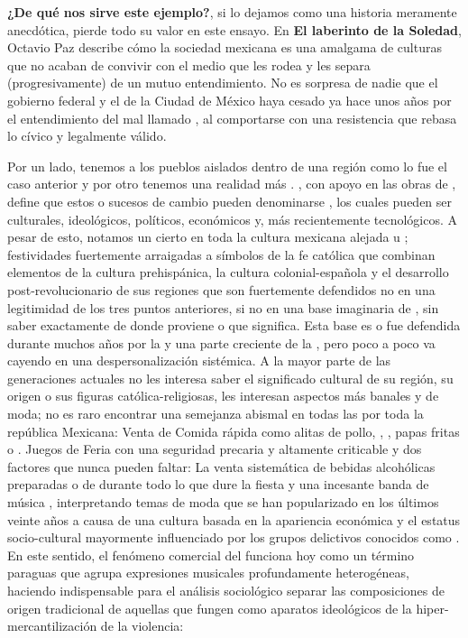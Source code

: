 \textbf{¿De qué nos sirve este ejemplo?}, si lo dejamos como una historia meramente anecdótica, pierde todo su valor en este ensayo.
En \textbf{El laberinto de la Soledad}, Octavio Paz describe cómo la sociedad mexicana es una amalgama de culturas que no acaban de
convivir con el medio que les rodea y les separa (progresivamente) de un mutuo entendimiento. No es sorpresa de nadie que el gobierno
federal y el de la Ciudad de México haya cesado ya hace unos años por el entendimiento del mal llamado ,
al comportarse con una resistencia que rebasa lo cívico y legalmente válido.

Por un lado, tenemos a los pueblos aislados dentro de una región como lo fue el caso anterior y por otro tenemos una realidad
más . , con apoyo en las obras de , define que estos 
o sucesos de cambio pueden denominarse , los cuales pueden ser culturales, ideológicos, políticos, económicos y,
más recientemente tecnológicos. A pesar de esto, notamos un cierto  en toda la cultura mexicana alejada u
; festividades fuertemente arraigadas a símbolos de la fe católica que combinan elementos de la cultura prehispánica,
la cultura colonial-española y el desarrollo post-revolucionario de sus regiones que son fuertemente defendidos no en una
legitimidad de los tres puntos anteriores, si no en una base imaginaria de , sin saber exactamente de donde
proviene o que significa. Esta base es o fue defendida durante muchos años por la  y una parte creciente
de la , pero poco a poco va cayendo en una despersonalización sistémica. A la mayor parte
de las generaciones actuales no les interesa saber el significado cultural de su región, su origen o sus figuras católica-religiosas,
les interesan aspectos más banales y de moda; no es raro encontrar una semejanza abismal en todas las  por
toda la república Mexicana: Venta de Comida rápida como alitas de pollo, , , papas fritas o
. Juegos de Feria con una seguridad precaria y altamente criticable y dos factores que nunca pueden faltar: La venta
sistemática de bebidas alcohólicas preparadas o de  durante todo lo que dure la fiesta y una incesante banda de música
, interpretando temas de moda que se han popularizado en los últimos veinte años a causa de una cultura basada
en la apariencia económica y el estatus socio-cultural mayormente influenciado por los grupos delictivos conocidos como
. En este sentido, el fenómeno comercial del  funciona hoy como un término
paraguas que agrupa expresiones musicales profundamente heterogéneas, haciendo indispensable para el análisis sociológico separar
las composiciones de origen tradicional de aquellas que fungen como aparatos ideológicos de la hiper-mercantilización de la violencia:

